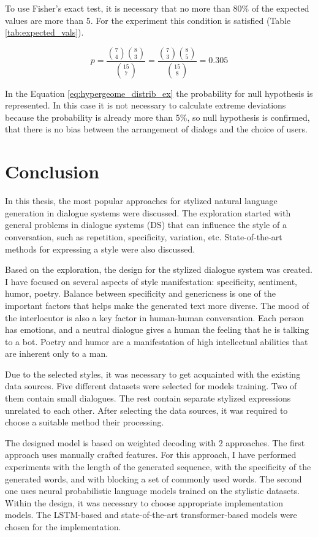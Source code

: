 To use Fisher's exact test, it is necessary that no more than 80\% of the expected values are more than 5. For the experiment this condition is satisfied (Table \ref{tab:expected_vals}).

\begin{equation} \label{eq:hypergeome_distrib_ex}
p = \frac{\binom{7}{4} \binom{8}{3}}{\binom{15}{7}} = \frac{\binom{7}{3} \binom{8}{5}}{\binom{15}{8}} = 0.305
\end{equation}

In the Equation \ref{eq:hypergeome_distrib_ex} the probability for null hypothesis is represented. In this case it is not necessary to calculate extreme deviations because the probability is already more than 5\%, so null hypothesis is confirmed, that there is no bias between the arrangement of dialogs and the choice of users.
\chapter{Conclusion} \label{conclusion}
In this thesis, the most popular approaches for stylized natural language generation in dialogue systems were discussed. The exploration started with general problems in dialogue systems (DS) that can influence the style of a conversation, such as repetition, specificity, variation, etc. State-of-the-art methods for expressing a style were also discussed.

Based on the exploration, the design for the stylized dialogue system was created. I have focused on several aspects of style manifestation: specificity, sentiment, humor, poetry. Balance between specificity and genericness is one of the important factors that helps make the generated text more diverse. The mood of the interlocutor is also a key factor in human-human conversation. Each person has emotions, and a neutral dialogue gives a human the feeling that he is talking to a bot. Poetry and humor are a manifestation of high intellectual abilities that are inherent only to a man. 

Due to the selected styles, it was necessary to get acquainted with the existing data sources. Five different datasets were selected for models training. Two of them contain small dialogues. The rest contain separate stylized expressions unrelated to each other. After selecting the data sources, it was required to choose a suitable method their processing.

The designed model is based on weighted decoding with 2 approaches. The first approach uses manually crafted features. For this approach, I have performed experiments with the length of the generated sequence, with the specificity of the generated words, and with blocking a set of commonly used words. The second one uses neural probabilistic language models trained on the stylistic datasets. Within the design, it was necessary to choose appropriate implementation models. The LSTM-based and state-of-the-art transformer-based models were chosen for the implementation.

